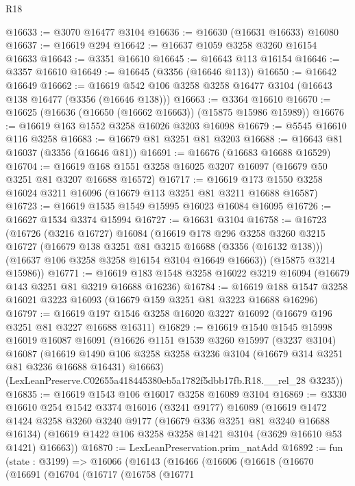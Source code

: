 \begin{lexlean}{R18}
\begin{coremodule}
@16633 := @3070 @16477 @3104
@16636 := @16630 (@16631 @16633) @16080
@16637 := @16619 @294
@16642 := @16637 @1059 @3258 @3260 @16154 @16633
@16643 := @3351 @16610
@16645 := @16643 @113 @16154
@16646 := @3357 @16610
@16649 := @16645 (@3356 (@16646 @113))
@16650 := @16642 @16649
@16662 := @16619 @542 @106 @3258 @3258 @16477 @3104 (@16643 @138 @16477 (@3356 (@16646 @138)))
@16663 := @3364 @16610
@16670 := @16625 (@16636 (@16650 (@16662 @16663)) (@15875 @15986 @15989))
@16676 := @16619 @163 @1552 @3258 @16026 @3203 @16098
@16679 := @5545 @16610 @116 @3258
@16683 := @16679 @81 @3251 @81 @3203
@16688 := @16643 @81 @16037 (@3356 (@16646 @81))
@16691 := @16676 (@16683 @16688 @16529)
@16704 := @16619 @168 @1551 @3258 @16025 @3207 @16097 (@16679 @50 @3251 @81 @3207 @16688 @16572)
@16717 := @16619 @173 @1550 @3258 @16024 @3211 @16096 (@16679 @113 @3251 @81 @3211 @16688 @16587)
@16723 := @16619 @1535 @1549 @15995 @16023 @16084 @16095
@16726 := @16627 @1534 @3374 @15994
@16727 := @16631 @3104
@16758 := @16723
    (@16726
      (@3216 @16727)
      @16084
      (@16619
        @178
        @296
        @3258
        @3260
        @3215
        @16727
        (@16679 @138 @3251 @81 @3215 @16688 (@3356 (@16132 @138)))
        (@16637 @106 @3258 @3258 @16154 @3104 @16649 @16663))
      (@15875 @3214 @15986))
@16771 := @16619 @183 @1548 @3258 @16022 @3219 @16094 (@16679 @143 @3251 @81 @3219 @16688 @16236)
@16784 := @16619 @188 @1547 @3258 @16021 @3223 @16093 (@16679 @159 @3251 @81 @3223 @16688 @16296)
@16797 := @16619 @197 @1546 @3258 @16020 @3227 @16092 (@16679 @196 @3251 @81 @3227 @16688 @16311)
@16829 := @16619
    @1540
    @1545
    @15998
    @16019
    @16087
    @16091
    (@16626
      @1151
      @1539
      @3260
      @15997
      (@3237 @3104)
      @16087
      (@16619 @1490 @106 @3258 @3258 @3236 @3104 (@16679 @314 @3251 @81 @3236 @16688 @16431) @16663)
      (LexLeanPreserve.C02655a418445380eb5a1782f5dbb17fb.R18.__rel_28 @3235))
@16835 := @16619 @1543 @106 @16017 @3258 @16089 @3104
@16869 := @3330
    @16610
    @254
    @1542
    @3374
    @16016
    (@3241 @9177)
    @16089
    (@16619
      @1472
      @1424
      @3258
      @3260
      @3240
      @9177
      (@16679 @336 @3251 @81 @3240 @16688 @16134)
      (@16619 @1422 @106 @3258 @3258 @1421 @3104 (@3629 @16610 @53 @1421) @16663))
@16870 := LexLeanPreservation.prim_natAdd
@16892 := fun (state : @3199) =>
  @16066
    (@16143
      (@16466
        (@16606
          (@16618
            (@16670
              (@16691
                (@16704
                  (@16717
                    (@16758
                      (@16771

\end{coremodule}
\end{lexlean}
